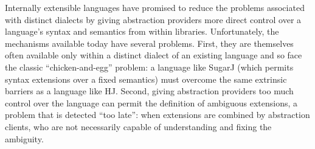 \documentclass[9pt,preprint]{sigplanconf}
\begin{document}
Internally extensible languages have promised to reduce the problems associated with distinct dialects by giving abstraction providers more direct control over a language's syntax and semantics from within libraries. %
Unfortunately, the mechanisms available today have several problems. First, they are themselves often available only within a distinct dialect of an existing language and so face the classic ``chicken-and-egg'' problem: a language like SugarJ \cite{erdweg2011sugarj} (which permits syntax extensions over a fixed semantics) must overcome the same extrinsic barriers as a language like HJ. Second, giving abstraction providers too much control over the language can permit the definition of ambiguous extensions, a problem that is detected ``too late'': when extensions are combined by abstraction clients, who are not necessarily  capable of understanding and fixing the ambiguity.%
\end{document}
